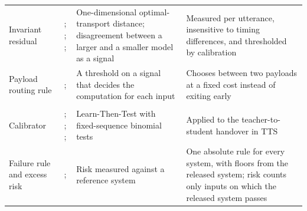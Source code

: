 {\begin{longtable}{@{}>{\raggedright\arraybackslash}p{2.6cm} >{\raggedright\arraybackslash}p{2.9cm} >{\raggedright\arraybackslash}p{3.7cm} >{\raggedright\arraybackslash}p{3.7cm}@{}}
Invariant residual & \textcite{peyre2019computational}; \textcite{munir2026track}; \textcite{sun2026hybridstitch}; \textcite{mualem2026aria} & One-dimensional optimal-transport distance; disagreement between a larger and a smaller model as a signal & Measured per utterance, insensitive to timing differences, and thresholded by calibration \\
Payload routing rule & \textcite{teerapittayanon2016branchynet}; \textcite{schuster2022calm} & A threshold on a signal that decides the computation for each input & Chooses between two payloads at a fixed cost instead of exiting early \\
\midrule
\multicolumn{4}{@{}l}{\textit{Offline calibration}} \\*
Calibrator & \textcite{angelopoulos2025ltt}; \textcite{bauer1991}; \textcite{clopper1934}; \textcite{wu2025thought} & Learn-Then-Test with fixed-sequence binomial tests & Applied to the teacher-to-student handover in TTS \\
Failure rule and excess risk & \textcite{schuster2022calm}; \textcite{damri2026confident} & Risk measured against a reference system & One absolute rule for every system, with floors from the released system; risk counts only inputs on which the released system passes \\
\end{longtable}
}

